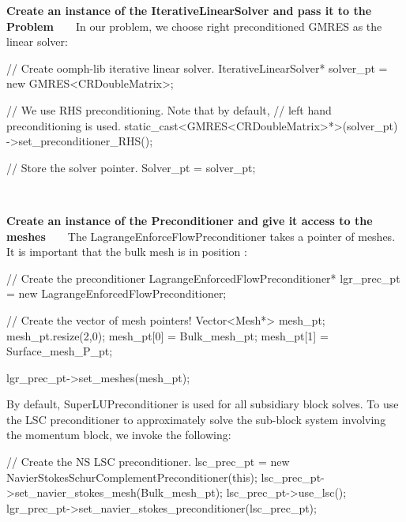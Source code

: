 \begin{DoxyEnumerate}
\item {\bfseries Create an instance of the Iterative\+Linear\+Solver and pass it to the Problem} ~\newline
~\newline
 In our problem, we choose right preconditioned {\ttfamily G\+M\+R\+ES} as the linear solver\+: ~\newline
~\newline
  
\begin{DoxyCodeInclude}
    \textcolor{comment}{// Create oomph-lib iterative linear solver.}
    IterativeLinearSolver* solver\_pt = \textcolor{keyword}{new} GMRES<CRDoubleMatrix>;
    
    \textcolor{comment}{// We use RHS preconditioning. Note that by default,}
    \textcolor{comment}{// left hand preconditioning is used.}
    \textcolor{keyword}{static\_cast<}GMRES<CRDoubleMatrix>*\textcolor{keyword}{>}(solver\_pt)
      ->set\_preconditioner\_RHS();

    \textcolor{comment}{// Store the solver pointer.}
    Solver\_pt = solver\_pt;

\end{DoxyCodeInclude}
 ~\newline
~\newline

\item {\bfseries Create an instance of the Preconditioner and give it access to the meshes} ~\newline
~\newline
 The {\ttfamily Lagrange\+Enforce\+Flow\+Preconditioner} takes a pointer of meshes. It is important that the bulk mesh is in position {} \+: 
\begin{DoxyCodeInclude}
  \textcolor{comment}{// Create the preconditioner}
  LagrangeEnforcedFlowPreconditioner* lgr\_prec\_pt
    = \textcolor{keyword}{new} LagrangeEnforcedFlowPreconditioner;

  \textcolor{comment}{// Create the vector of mesh pointers!}
  Vector<Mesh*> mesh\_pt;
  mesh\_pt.resize(2,0);
  mesh\_pt[0] = Bulk\_mesh\_pt;
  mesh\_pt[1] = Surface\_mesh\_P\_pt;

  lgr\_prec\_pt->set\_meshes(mesh\_pt);

\end{DoxyCodeInclude}
 By default, {\ttfamily Super\+L\+U\+Preconditioner} is used for all subsidiary block solves. To use the L\+SC preconditioner to approximately solve the sub-\/block system involving the momentum block, we invoke the following\+: 
\begin{DoxyCodeInclude}
    \textcolor{comment}{// Create the NS LSC preconditioner.}
    lsc\_prec\_pt = \textcolor{keyword}{new} NavierStokesSchurComplementPreconditioner(\textcolor{keyword}{this});
    lsc\_prec\_pt->set\_navier\_stokes\_mesh(Bulk\_mesh\_pt);
    lsc\_prec\_pt->use\_lsc();
    lgr\_prec\_pt->set\_navier\_stokes\_preconditioner(lsc\_prec\_pt);


\end{DoxyCodeInclude}
\end{DoxyEnumerate}
